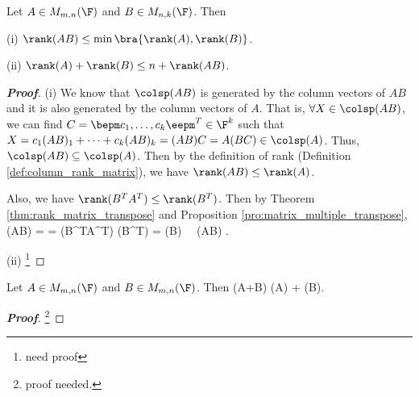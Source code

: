 \begin{proposition}\label{pro:matrix_rank_inequalities_product}%
Let $A\in M_{m,n}(\F)$ and $B\in M_{n,k}(\F)$. Then
\ben
\item [(i)] $\rank(AB) \leq \min\bra{\rank(A), \rank(B)}$.
\item [(ii)] $\rank(A) + \rank(B) \leq n + \rank(AB)$.
\een
\end{proposition}

\begin{proof}[\bf Proof]
\ben
\item [(i)] We know that $\colsp(AB)$ is generated by the column vectors of $AB$ and it is also generated by the column vectors of $A$. That is, $\forall X\in \colsp(AB)$, we can find $C = \bepm c_1,\dots,c_k\eepm^T \in \F^k$ such that $X = c_1 (AB)_1 + \dots + c_k (AB)_k = (AB) C = A(BC) \in \colsp(A)$. Thus, $\colsp(AB)\subseteq \colsp(A)$. Then by the definition of rank (Definition \ref{def:column_rank_matrix}), we have $\rank(AB) \leq \rank(A)$.   %

Also, we have $\rank(B^TA^T) \leq \rank(B^T)$. Then by Theorem \ref{thm:rank_matrix_transpose} and Proposition \ref{pro:matrix_multiple_transpose},
\be
\rank(AB) = \rank{} = \rank(B^TA^T) \leq \rank(B^T) = \rank(B) \ \ra \ \rank(AB) \leq \min{}.
\ee

\item [(ii)] \footnote{need proof}
\een
\end{proof}

\begin{proposition}\label{pro:subadditivity_matrix_rank}%
Let $A\in M_{m,n}(\F)$ and $B\in M_{m,n}(\F)$. Then
\be
\rank(A+B) \leq \rank(A) + \rank(B).
\ee
\end{proposition}

\begin{proof}[\bf Proof]
\footnote{proof needed.}
\end{proof}



